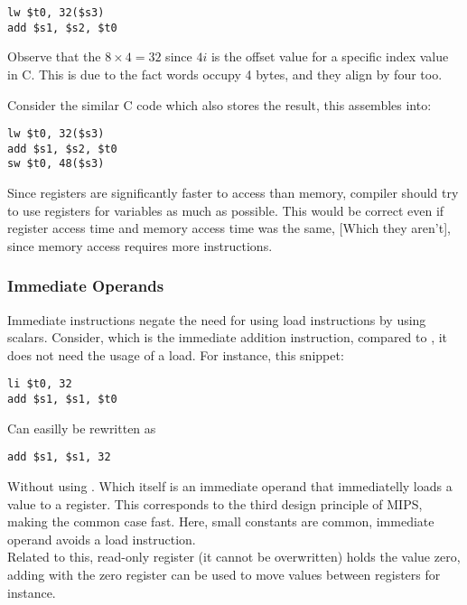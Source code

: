\documentclass[11pt,a4paper,twocolumn]{book}
\begin{document}
\begin{lstlisting}
lw $t0, 32($s3)
add $s1, $s2, $t0
\end{lstlisting}

Observe that the $8 \times 4 = 32$ since $4i$ is the offset value for a specific index value in C. This is due to the fact words occupy 4 bytes, and they align by four too.

Consider the similar C code  which also stores the result, this assembles into:

\begin{lstlisting}
lw $t0, 32($s3)
add $s1, $s2, $t0
sw $t0, 48($s3)
\end{lstlisting}

\missed \missed \missed

Since registers are significantly faster to access than memory, compiler should try to use registers for variables as much as possible. This would be correct even if register access time and memory access time was the same, [Which they aren't], since memory access requires more instructions.

\subsubsection{Immediate Operands}

Immediate instructions negate the need for using load instructions by using scalars. Consider,  which is the immediate addition instruction, compared to , it does not need the usage of a load. For instance, this snippet:

\begin{lstlisting}
li $t0, 32
add $s1, $s1, $t0
\end{lstlisting}

Can easilly be rewritten as

\begin{lstlisting}
add $s1, $s1, 32
\end{lstlisting}

Without using . Which itself is an immediate operand that immediatelly loads a value to a register. This corresponds to the third design principle of MIPS, making the common case fast. Here, small constants are common, immediate operand avoids a load instruction.\\

Related to this,  read-only register (it cannot be overwritten) holds the value zero, adding with the zero register can be used to move values between registers for instance.
\end{document}
